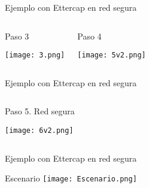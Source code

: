 \documentclass{beamer}
\begin{document}
\begin{frame}{Ejemplo con Ettercap en red segura}
\begin{columns}
\begin{block}{Paso 3}
	\begin{center}
		\texttt{[image: 3.png]}
	\end{center}
\end{block}
\begin{block}{Paso 4}
	\begin{center}
		\texttt{[image: 5v2.png]}
	\end{center}
	
\end{block}

\end{columns}
\end{frame}


\begin{frame}{Ejemplo con Ettercap en red segura}
\begin{columns}
	\begin{block}{Paso 5. Red segura}
		\begin{center}
			\texttt{[image: 6v2.png]}
		\end{center}
		
	\end{block}
	
\end{columns}
\end{frame}

\begin{frame}{Ejemplo con Ettercap en red segura}
\begin{block}{Escenario}
	\texttt{[image: Escenario.png]}
\end{block}
\end{frame}

\end{document}
